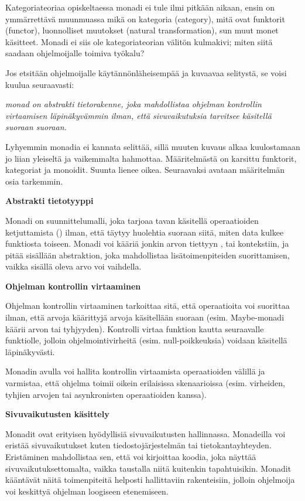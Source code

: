 Kategoriateoriaa opiskeltaessa monadi ei tule ilmi pitkään aikaan, ensin on ymmärrettävä muunmuassa mikä on kategoria (category), mitä ovat funktorit (functor), luonnolliset muutokset (natural transformation), sun muut monet käsitteet. Monadi ei siis ole kategoriateorian välitön kulmakivi; miten siitä saadaan ohjelmoijalle toimiva työkalu?

Jos etsitään ohjelmoijalle käytännönläheisempää ja kuvaavaa selitystä, se voisi kuulua seuraavasti:

\textit{\Gls{monad} on abstrakti tietorakenne, joka mahdollistaa ohjelman kontrollin virtaamisen läpinäkyvämmin ilman, että sivuvaikutuksia tarvitsee käsitellä suoraan suoraan.}

Lyhyemmin monadia ei kannata selittää, sillä muuten kuvaus alkaa kuulostamaan jo liian yleiseltä ja vaikemmalta hahmottaa. Määritelmästä on karsittu funktorit, kategoriat ja monoidit. Suunta lienee oikea. Seuraavaksi avataan määritelmän osia tarkemmin.

\textbf{Abstrakti tietotyyppi}

Monadi on suunnittelumalli, joka tarjoaa tavan käsitellä operaatioiden ketjuttamista () ilman, että täytyy huolehtia suoraan siitä, miten data kulkee funktiosta toiseen. Monadi voi kääriä jonkin arvon tiettyyn , tai kontekstiin, ja pitää sisällään abstraktion, joka mahdollistaa lisätoimenpiteiden suorittamisen, vaikka sisällä oleva arvo voi vaihdella.

\textbf{Ohjelman kontrollin virtaaminen}

Ohjelman kontrollin virtaaminen tarkoittaa sitä, että operaatioita voi suorittaa ilman, että arvoja käärittyjä arvoja käsitellään suoraan (esim. Maybe-monadi käärii arvon tai tyhjyyden). Kontrolli virtaa funktion kautta seuraavalle funktiolle, jolloin ohjelmointivirheitä (esim. null-poikkeuksia) voidaan käsitellä läpinäkyvästi.

Monadin avulla voi hallita kontrollin virtaamista operaatioiden välillä ja varmistaa, että ohjelma toimii oikein erilaisissa skenaarioissa (esim. virheiden, tyhjien arvojen tai asynkronisten operaatioiden kanssa).

\textbf{Sivuvaikutusten käsittely}

Monadit ovat erityisen hyödyllisiä sivuvaikutusten hallinnassa. Monadeilla voi eristää sivuvaikutukset kuten tiedostojärjestelmän tai tietokantayhteyden. Eristäminen mahdollistaa sen, että voi kirjoittaa koodia, joka näyttää sivuvaikutuksettomalta, vaikka taustalla niitä kuitenkin tapahtuisikin. Monadit kääntävät näitä toimenpiteitä helposti hallittaviin rakenteisiin, jolloin ohjelmoija voi keskittyä ohjelman loogiseen etenemiseen.

